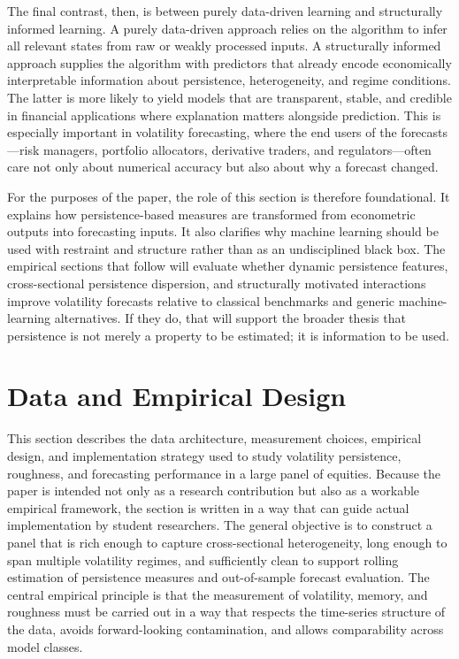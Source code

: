 \documentclass[12pt]{article}
\begin{document}
The final contrast, then, is between purely data-driven learning and structurally informed learning. A purely data-driven approach relies on the algorithm to infer all relevant states from raw or weakly processed inputs. A structurally informed approach supplies the algorithm with predictors that already encode economically interpretable information about persistence, heterogeneity, and regime conditions. The latter is more likely to yield models that are transparent, stable, and credible in financial applications where explanation matters alongside prediction. This is especially important in volatility forecasting, where the end users of the forecasts---risk managers, portfolio allocators, derivative traders, and regulators---often care not only about numerical accuracy but also about why a forecast changed.

For the purposes of the paper, the role of this section is therefore foundational. It explains how persistence-based measures are transformed from econometric outputs into forecasting inputs. It also clarifies why machine learning should be used with restraint and structure rather than as an undisciplined black box. The empirical sections that follow will evaluate whether dynamic persistence features, cross-sectional persistence dispersion, and structurally motivated interactions improve volatility forecasts relative to classical benchmarks and generic machine-learning alternatives. If they do, that will support the broader thesis that persistence is not merely a property to be estimated; it is information to be used.



\section{Data and Empirical Design}
\label{sec:data}

This section describes the data architecture, measurement choices, empirical design, and implementation strategy used to study volatility persistence, roughness, and forecasting performance in a large panel of equities. Because the paper is intended not only as a research contribution but also as a workable empirical framework, the section is written in a way that can guide actual implementation by student researchers. The general objective is to construct a panel that is rich enough to capture cross-sectional heterogeneity, long enough to span multiple volatility regimes, and sufficiently clean to support rolling estimation of persistence measures and out-of-sample forecast evaluation. The central empirical principle is that the measurement of volatility, memory, and roughness must be carried out in a way that respects the time-series structure of the data, avoids forward-looking contamination, and allows comparability across model classes.
\end{document}
